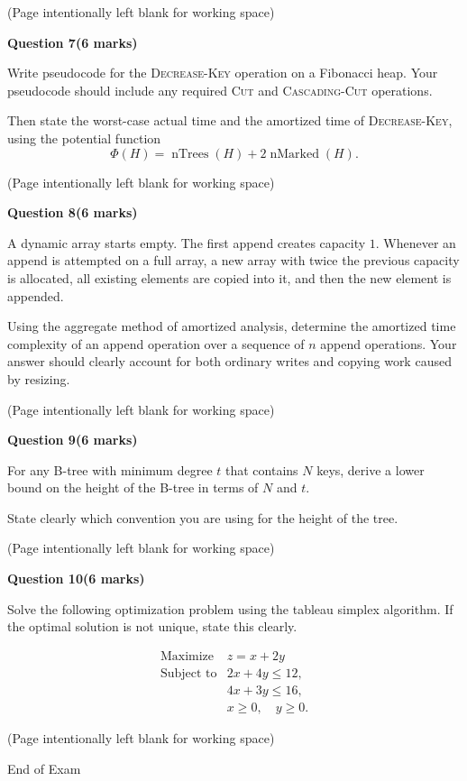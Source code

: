 \documentclass[12pt,letterpaper]{article}
\newcommand{\marksbox}[1]{%
  \vfill
  \begin{flushright}
    \fbox{\parbox[c][1.1cm][c]{1.3cm}{\centering #1}}
  \end{flushright}
}
\newcommand{\questiontitle}[2]{%
  \textbf{Question #1}\hfill\textbf{(#2 marks)}
}
\newcommand{\workingpage}{%
  \newpage
  \begin{center}
    (Page intentionally left blank for working space)
  \end{center}
}
\begin{document}
\marksbox{6}

\workingpage
\newpage

\questiontitle{7}{6}

Write pseudocode for the \textsc{Decrease-Key} operation on a Fibonacci heap.
Your pseudocode should include any required \textsc{Cut} and
\textsc{Cascading-Cut} operations.

Then state the worst-case actual time and the amortized time of
\textsc{Decrease-Key}, using the potential function
\[
  \Phi(H) = \operatorname{nTrees}(H) + 2\operatorname{nMarked}(H).
\]

\marksbox{6}

\workingpage
\newpage

\questiontitle{8}{6}

A dynamic array starts empty. The first append creates capacity $1$. Whenever an
append is attempted on a full array, a new array with twice the previous capacity
is allocated, all existing elements are copied into it, and then the new element
is appended.

Using the aggregate method of amortized analysis, determine the amortized time
complexity of an append operation over a sequence of $n$ append operations.
Your answer should clearly account for both ordinary writes and copying work
caused by resizing.

\marksbox{6}

\workingpage
\newpage

\questiontitle{9}{6}

For any B-tree with minimum degree $t$ that contains $N$ keys, derive a lower
bound on the height of the B-tree in terms of $N$ and $t$.

State clearly which convention you are using for the height of the tree.

\marksbox{6}

\workingpage
\newpage

\questiontitle{10}{6}

Solve the following optimization problem using the tableau simplex algorithm.
If the optimal solution is not unique, state this clearly.

\[
\begin{array}{rl}
\text{Maximize} & z = x + 2y \\
\text{Subject to} & 2x + 4y \leq 12, \\
                  & 4x + 3y \leq 16, \\
                  & x \geq 0,\quad y \geq 0.
\end{array}
\]

\marksbox{6}

\workingpage

\vfill
\begin{center}
  End of Exam
\end{center}
\end{document}
